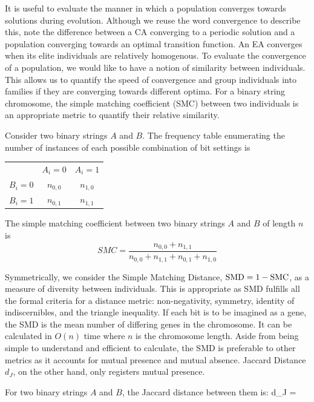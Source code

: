 It is useful to evaluate the manner in which a population converges towards solutions during evolution. Although we reuse the word convergence to describe this, note the difference between a CA converging to a periodic solution and a population converging towards an optimal transition function. An EA converges when its elite individuals are relatively homogenous. To evaluate the convergence of a population, we would like to have a notion of similarity between individuals. This allows us to quantify the speed of convergence and group individuals into families if they are converging towards different optima. For a binary string chromosome, the simple matching coefficient (SMC) between two individuals is an appropriate metric to quantify their relative similarity. 
\begin{definition} Consider two binary strings $A$ and $B$. The frequency table enumerating the number of instances of each possible combination of bit settings is
\begin{center}
    \begin{tabular}{ c c c }
              & $A_i = 0$ & $A_i = 1$ \\ 
        $B_i = 0$ & $n_{0,0}$ & $n_{1,0}$ \\  
        $B_i = 1$ & $n_{0,1}$ & $n_{1, 1}$    
    \end{tabular}
\end{center}
The simple matching coefficient between two binary strings $A$ and $B$ of length $n$ is\\
\begin{equation}
    SMC = \frac{n_{0, 0} + n_{1, 1}}{n_{0, 0} + n_{1, 1} + n_{0, 1} + n_{1, 0}}
\end{equation}
    
\end{definition}
Symmetrically, we consider the Simple Matching Distance, $\textnormal{SMD} = 1 - \textnormal{SMC}$, as a measure of diversity between individuals. This is appropriate as SMD fulfills all the formal criteria for a distance metric: non-negativity, symmetry, identity of indiscernibles, and the triangle inequality. If each bit is to be imagined as a gene, the SMD is the mean number of differing genes in the chromosome. It can be calculated in $O(n)$ time where $n$ is the chromosome length. Aside from being simple to understand and efficient to calculate, the SMD is preferable to other metrics as it accounts for mutual presence and mutual absence. Jaccard Distance $d_J$, on the other hand, only registers mutual presence. 
\begin{definition}
For two binary strings $A$ and $B$, the Jaccard distance between them is:
    d_J = 
\end{definition}

